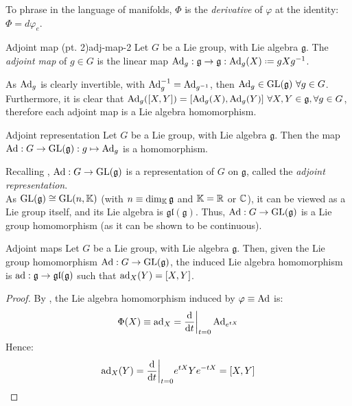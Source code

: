 To phrase  in the language of manifolds, $ \Phi $ is the \textit{derivative} of $ \varphi $ at the identity: $ \Phi = d\varphi_e $.

\begin{definition}{Adjoint map (pt. 2)}{adj-map-2}
  Let $ G $ be a Lie group, with Lie algebra $ \mathfrak{g} $. The \textit{adjoint map} of $ g \in G $ is the linear map $ \Ad_g : \mathfrak{g} \rightarrow \mathfrak{g} : \Ad_g(X) \defeq g X g^{-1} $.
\end{definition}

As $ \operatorname{Ad}_g $ is clearly invertible, with $ \operatorname{Ad}_g^{-1} = \operatorname{Ad}_{g^{-1}} $, then $ \operatorname{Ad}_g \in \mathrm{GL}(\mathfrak{g}) \,\,\forall g \in G $. Furthermore, it is clear that $ \operatorname{Ad}_g([X,Y]) = [\operatorname{Ad}_g(X),\operatorname{Ad}_g(Y)] \,\,\forall X,Y \in \mathfrak{g} , \forall g \in G $, therefore each adjoint map is a Lie algebra homomorphism.

\begin{proposition}{Adjoint representation}{}
  Let $ G $ be a Lie group, with Lie algebra $ \mathfrak{g} $. Then the map $ \operatorname{Ad} : G \rightarrow \mathrm{GL}(\mathfrak{g}) : g \mapsto \operatorname{Ad}_g $ is a homomorphism.
\end{proposition}

Recalling , $ \operatorname{Ad} : G \rightarrow \mathrm{GL}(\mathfrak{g}) $ is a representation of $ G $ on $ \mathfrak{g} $, called the \textit{adjoint representation}.\\
As $ \mathrm{GL}(\mathfrak{g}) \cong \mathrm{GL}(n,\mathbb{K}) $ (with $ n \equiv \dim_{\mathbb{K}} \mathfrak{g} $ and $ \mathbb{K} = \mathbb{R} $ or $ \mathbb{C} $), it can be viewed as a Lie group itself, and its Lie algebra is $ \mathfrak{gl}(\mathfrak{g}) $. Thus, $ \operatorname{Ad} : G \rightarrow \mathrm{GL}(\mathfrak{g}) $ is a Lie group homomorphism (as it can be shown to be continuous).

\begin{proposition}{Adjoint maps}{}
  Let $ G $ be a Lie group, with Lie algebra $ \mathfrak{g} $. Then, given the Lie group homomorphism $ \operatorname{Ad} : G \rightarrow \mathrm{GL}(\mathfrak{g}) $, the induced Lie algebra homomorphism is $ \operatorname{ad} : \mathfrak{g} \rightarrow \mathfrak{gl}(\mathfrak{g}) $ such that $ \operatorname{ad}_X(Y) = [X,Y] $.
\end{proposition}

\begin{proofbox}
  \begin{proof}
    By , the Lie algebra homomorphism induced by $ \varphi \equiv \operatorname{Ad} $ is:
    \begin{equation*}
      \Phi(X) \equiv \operatorname{ad}_X = \frac{\mathrm{d}}{\mathrm{d} t}\bigg\vert_{t = 0} \operatorname{Ad}_{e^{tX}}
    \end{equation*}
    Hence:
    \begin{equation*}
      \operatorname{ad}_X(Y) = \frac{\mathrm{d}}{\mathrm{d} t}\bigg\vert_{t = 0} e^{tX} Y e^{-tX} = [X,Y]
    \end{equation*}
  \end{proof}
\end{proofbox}

